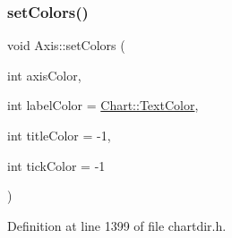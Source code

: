 \subsubsection{\texorpdfstring{set\+Colors()}{setColors()}}
{\footnotesize\ttfamily void Axis\+::set\+Colors (\begin{DoxyParamCaption}\item[{int}]{axis\+Color,  }\item[{int}]{label\+Color = {\ttfamily \hyperlink{namespace_chart_abee0d882fdc9ad0b001245ad9fc64011a879e14f2f5024caccc047374342321ef}{Chart\+::\+Text\+Color}},  }\item[{int}]{title\+Color = {\ttfamily -\/1},  }\item[{int}]{tick\+Color = {\ttfamily -\/1} }\end{DoxyParamCaption})\hspace{0.3cm}{\ttfamily [inline]}}



Definition at line 1399 of file chartdir.\+h.


